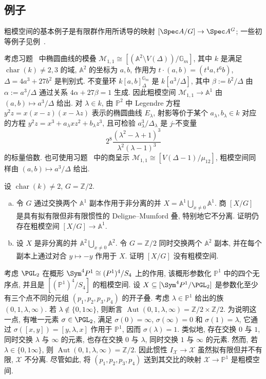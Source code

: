 \subsection{例子}\label{src:5.4.3-subsection}
粗模空间的基本例子是有限群作用所诱导的映射 $[\Spec A/G]\to\Spec A^G$; 一些初等例子见例~.
\begin{example}[椭圆曲线]\label{src:5.4.15}
考虑习题~ 中椭圆曲线的模叠 $\mathcal M_{1,1}\cong[(\mathbb A^2\setminus V(\Delta))/\mathbb G_m]$, 其中 $k$ 是满足 $\operatorname{char}(k)\neq2,3$ 的域, $\mathbb A^2$ 的坐标为 $a,b$, 作用为 $t\cdot(a,b)=(t^4a,t^6b)$, $\Delta=4a^3+27b^2$ 是判别式. 不变量环 $k[a,b]_\Delta^{\mathbb G_m}$ 是 $k[a^3/\Delta]$, 其中 $\beta:=b^2/\Delta$ 由 $\alpha:=a^3/\Delta$ 通过关系 $4\alpha+27\beta=1$ 生成. 因此粗模空间 $\mathcal M_{1,1}\to\mathbb A^1$ 由 $(a,b)\mapsto a^3/\Delta$ 给出. 对 $\lambda\in k$, 由 $\mathbb P^2$ 中 Legendre 方程 $y^2z=x(x-z)(x-\lambda z)$ 表示的椭圆曲线 $E_\lambda$, 射影等价于某个 $a_\lambda,b_\lambda\in k$ 对应的方程 $y^2z=x^3+a_\lambda xz^2+b_\lambda z^3$, 且可检验 $a_\lambda^3/\Delta_\lambda$ 是 $j$-不变量
\[
2^8\frac{(\lambda^2-\lambda+1)^3}{\lambda^2(\lambda-1)^3}
\]
的标量倍数. 也可使用习题~ 中的商呈示 $\mathcal M_{1,1}\cong[V(\Delta-1)/\mu_{12}]$, 粗模空间同样由 $(a,b)\mapsto a^3/\Delta$ 给出.
\end{example}
\begin{exercise}[困难]\label{src:5.4.16}
设 $\operatorname{char}(k)\neq2$, $G=\mathbb Z/2$.
\begin{enumerate}[(a)]
\item 令 $G$ 通过交换两个 $\mathbb A^1$ 副本作用于非分离的并 $X=\mathbb A^1\bigcup_{x\neq0}\mathbb A^1$. 商 $[X/G]$ 是具有拟有限但非有限惯性的 Deligne--Mumford 叠, 特别地它不分离. 证明仍存在粗模空间 $[X/G]\to\mathbb A^1$.
\item 设 $X$ 是非分离的并 $\mathbb A^2\bigcup_{x\neq0}\mathbb A^2$. 令 $G=\mathbb Z/2$ 同时交换两个 $\mathbb A^2$ 副本, 并在每个副本上通过对合 $y\mapsto-y$ 作用于 $X$. 证明 $[X/G]$ 没有粗模空间.
\end{enumerate}
\end{exercise}
\newpage
\begin{example}\label{src:5.4.17}
考虑 $\PGL_2$ 在概形 $\Sym^4\mathbb P^1\cong(\mathbb P^1)^4/S_4$ 上的作用, 该概形参数化 $\mathbb P^1$ 中的四个无序点, 并且是 $[(\mathbb P^1)^4/S_4]$ 的粗模空间. 设 $\mathcal X\subseteq[\Sym^4\mathbb P^1/\PGL_2]$ 是参数化至少有三个点不同的元组 $(p_1,p_2,p_3,p_4)$ 的开子叠. 考虑 $\lambda\in\mathbb P^1$ 给出的族 $(0,1,\lambda,\infty)$. 若 $\lambda\notin\{0,1\infty\}$, 则断言 $\operatorname{Aut}(0,1,\lambda,\infty)=\mathbb Z/2\times\mathbb Z/2$. 为说明这一点, 有唯一元素 $\sigma\in\PGL_2$, 满足 $\sigma(0)=\infty$, $\sigma(\infty)=0$ 和 $\sigma(1)=\lambda$, 它通过 $\sigma([x,y])=[y,\lambda,x]$ 作用于 $\mathbb P^1$, 因而 $\sigma(\lambda)=1$. 类似地, 存在交换 $0$ 与 $1$, 同时交换 $\lambda$ 与 $\infty$ 的元素, 也存在交换 $0$ 与 $\lambda$, 同时交换 $1$ 与 $\infty$ 的元素. 然而, 若 $\lambda\in\{0,1\infty\}$, 则 $\operatorname{Aut}(0,1,\lambda,\infty)=\mathbb Z/2$. 因此惯性 $I_{\mathcal X}\to\mathcal X$ 虽然拟有限但并不有限, $\mathcal X$ 不分离. 尽管如此, 将 $(p_1,p_2,p_3,p_4)$ 送到其交比的映射 $\mathcal X\to\mathbb P^1$ 是粗模空间.
\end{example}
